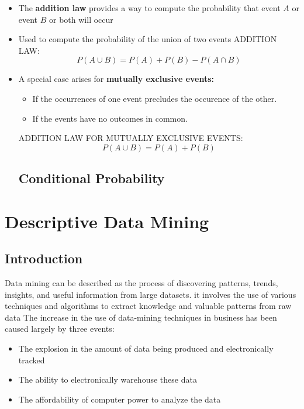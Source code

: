 \documentclass{report}
\begin{document}
\begin{itemize}
\begin{figure}[ht]
\end{figure}
\item The \textbf{addition law} provides a way to compute the probability that event $A$ or event $B$ or both will occur
\item Used to compute the probability of the union of two events
  \bigbreak \noindent
ADDITION LAW:
$$ P(A\cup B) = P(A) + P(B) - P(A \cap B)$$
\newpage
\item A special case arises for \textbf{mutually exclusive events:}
  \begin{itemize}[label=$\circ$]
    \item If the occurrences of one event precludes the occurence of the other. 
    \item If the events have no outcomes in common.
  \end{itemize}
  \bigbreak \noindent
\begin{figure}[ht]
    \centering
    \hspace{19mm}
\end{figure}
\bigbreak \noindent
ADDITION LAW FOR MUTUALLY EXCLUSIVE EVENTS:
$$ P(A\cup B) = P(A) + P(B)$$
\section{Conditional Probability}

\end{itemize}














  \chapter{Descriptive Data Mining}
  \section{Introduction}
  Data mining can be described as the process of discovering patterns, trends, insights, and useful information from large datasets.
  it involves the use of various techniques and algorithms to extract knowledge and valuable patterns from raw data
  \bigbreak \noindent
The increase in the use of data-mining techniques in business has been caused largely by three events:
\begin{itemize}
  \item The explosion in the amount of data being produced and electronically tracked
  \item The ability to electronically warehouse these data
  \item The affordability of computer power to analyze the data
\end{itemize}
\end{document}
